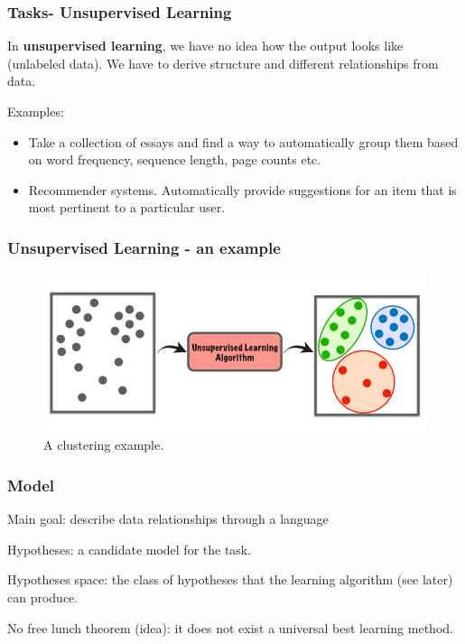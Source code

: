 \documentclass{beamer}
\begin{document}
	\begin{frame}
		\frametitle{Tasks- Unsupervised Learning}
		In \textbf{unsupervised learning}, we have no idea how the output looks like (unlabeled data). We have to derive structure and different relationships from data.
		
		Examples:
		\begin{itemize}
			\item Take a collection of essays and find a way to automatically group them based on word frequency, sequence length, page counts etc.
			\item Recommender systems. Automatically provide suggestions for an item
			that is most pertinent to a particular user.
		\end{itemize} 
		
	\end{frame}

	\begin{frame}
		\frametitle{Unsupervised Learning - an example}
		\begin{figure}
			\centering
			\includegraphics[scale=0.35]{images/unsupervised-learning}
			\caption{A clustering example.}
		\end{figure}
	\end{frame}

	\begin{frame}
		\frametitle{Model}
		Main goal: describe data relationships through a language
		
		\vspace{5mm}
		
		Hypotheses: a candidate model for the task.
		
		Hypotheses space: the class of hypotheses that the learning algorithm (see later) can produce.
		
		\vspace{5mm}
		
		No free lunch theorem (idea): it does not exist a universal best learning method.
	\end{frame}
\end{document}
